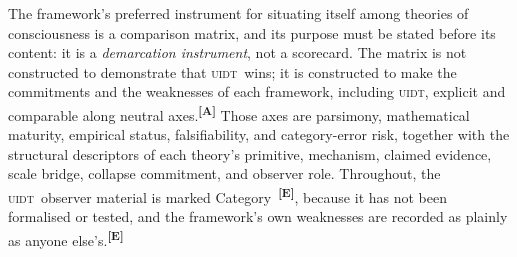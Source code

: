 \documentclass[12pt,a4paper,twoside]{article}
\theoremstyle{plain}
\theoremstyle{definition}
\theoremstyle{remark}
\newcommand{\UIDT}{\textsc{uidt}}
\newcommand{\catmark}[1]{\textsuperscript{\textsf{\textbf{[#1]}}}}
\begin{document}
The framework's preferred instrument for situating itself among theories of consciousness is a comparison matrix, and its purpose must be stated before its content: it is a \emph{demarcation instrument}, not a scorecard. The matrix is not constructed to demonstrate that \UIDT\ wins; it is constructed to make the commitments and the weaknesses of each framework, including \UIDT, explicit and comparable along neutral axes.\catmark{A} Those axes are parsimony, mathematical maturity, empirical status, falsifiability, and category-error risk, together with the structural descriptors of each theory's primitive, mechanism, claimed evidence, scale bridge, collapse commitment, and observer role. Throughout, the \UIDT\ observer material is marked Category~\catmark{E}, because it has not been formalised or tested, and the framework's own weaknesses are recorded as plainly as anyone else's.\catmark{E}
\end{document}
